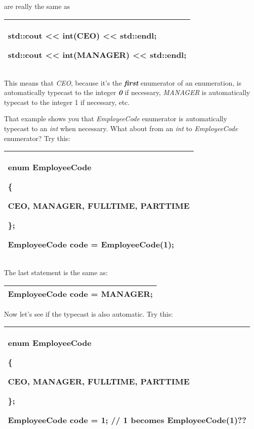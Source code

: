 \documentclass[
]{article}
\begin{document}
are really the same as

\begin{longtable}[]{@{}l@{}}
\toprule
\endhead
\begin{minipage}[t]{0.97\columnwidth}\raggedright
std::cout \textless\textless{} int(CEO) \textless\textless{} std::endl;

std::cout \textless\textless{} int(MANAGER) \textless\textless{}
std::endl;\strut
\end{minipage}\tabularnewline
\bottomrule
\end{longtable}

This means that \emph{CEO}, because it's the \emph{\textbf{first}}
enumerator of an enumeration, is automatically typecast to the integer
\emph{\textbf{0}} if necessary, \emph{MANAGER} is automatically typecast
to the integer 1 if necessary, etc.

That example shows you that \emph{EmployeeCode} enumerator is
automatically typecast to an \emph{int} when necessary. What about from
an \emph{int} to \emph{EmployeeCode} enumerator? Try this:

\begin{longtable}[]{@{}l@{}}
\toprule
\endhead
\begin{minipage}[t]{0.97\columnwidth}\raggedright
enum EmployeeCode

\{

CEO, MANAGER, FULLTIME, PARTTIME

\};

EmployeeCode code = EmployeeCode(1);\strut
\end{minipage}\tabularnewline
\bottomrule
\end{longtable}

The last statement is the same as:

\begin{longtable}[]{@{}l@{}}
\toprule
\endhead
EmployeeCode code = MANAGER;\tabularnewline
\bottomrule
\end{longtable}

Now let's see if the typecast is also automatic. Try this:

\begin{longtable}[]{@{}l@{}}
\toprule
\endhead
\begin{minipage}[t]{0.97\columnwidth}\raggedright
enum EmployeeCode

\{

CEO, MANAGER, FULLTIME, PARTTIME

\};

EmployeeCode code = 1; // 1 becomes EmployeeCode(1)??\strut
\end{minipage}\tabularnewline
\bottomrule
\end{longtable}
\end{document}

